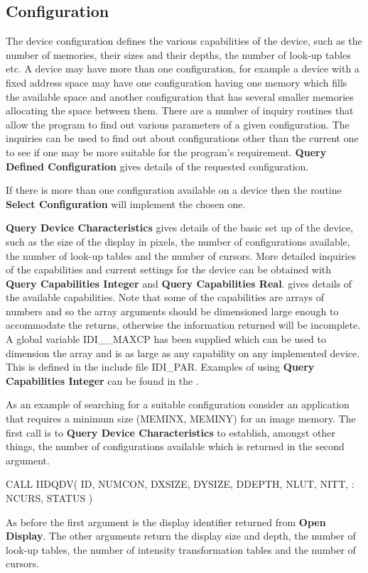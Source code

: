 \documentclass[11pt,nolof]{starlink}
\begin{document}
\subsection{Configuration}

The device configuration defines the various capabilities of the device,
such as the number of memories, their sizes and their depths, the
number of look-up tables etc. A device may have more than one
configuration, for example a device with a fixed address space
may have one configuration having one memory which fills the available
space and another configuration that has several smaller memories
allocating the space between them. There are a number of inquiry routines
that allow the program to find out various parameters of a given
configuration. The inquiries can be used to find out about configurations
other than the current one to see if one may be more suitable for the
program's requirement. \textbf{Query Defined Configuration} gives details
of the requested configuration.

If there is more than one configuration available on a device then the
routine \textbf{Select Configuration} will implement the chosen one.

\textbf{Query Device Characteristics} gives details of the basic set up
of the device, such as the size of the display in pixels, the number
of configurations available, the number of look-up tables and the number
of cursors. More detailed inquiries of the capabilities and current
settings for the device can be obtained with \textbf{Query Capabilities
Integer} and \textbf{Query Capabilities Real}.
 gives details of the
available capabilities. Note that
some of the capabilities are arrays of numbers and so the array arguments
should be dimensioned large enough to accommodate the returns, otherwise the
information returned will be incomplete. A global variable IDI\_\_MAXCP
has been supplied which can be used to dimension the array and is
as large as any capability on any implemented device. This is defined
in the include file IDI\_PAR. Examples of using
\textbf{Query Capabilities Integer} can be found in the
.

As an example of searching for a suitable configuration consider an
application that requires a minimum size (MEMINX, MEMINY) for an
image memory. The first call is to \textbf{Query Device Characteristics}
to establish, amongst other things, the number of configurations
available which is returned in the second argument.
\begin{small}
\begin{terminalv}
      CALL IIDQDV( ID, NUMCON, DXSIZE, DYSIZE, DDEPTH, NLUT, NITT,
     :             NCURS, STATUS )
\end{terminalv}
\end{small}
As before the first argument is the display identifier returned from
\textbf{Open Display}. The other arguments return the display size and
depth, the number of look-up tables, the number of intensity
transformation tables and the number of cursors.
\end{document}
